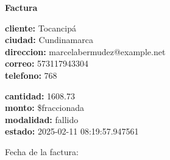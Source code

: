 \documentclass{article}
\begin{document}
\begin{center}
    {\LARGE \textbf{Factura}}\\[1cm]
\end{center}

\textbf{cliente:} Tocancipá \\
\textbf{ciudad:} Cundinamarca \\
\textbf{direccion:} marcelabermudez@example.net \\
\textbf{correo:} 573117943304 \\
\textbf{telefono:} 768 \\

\vspace{0.5cm}

\textbf{cantidad:} 1608.73 \\
\textbf{monto:} \$fraccionada \\
\textbf{modalidad:} fallido \\
\textbf{estado:} 2025-02-11 08:19:57.947561 \\

\vspace{1cm}

Fecha de la factura: 
\end{document}
